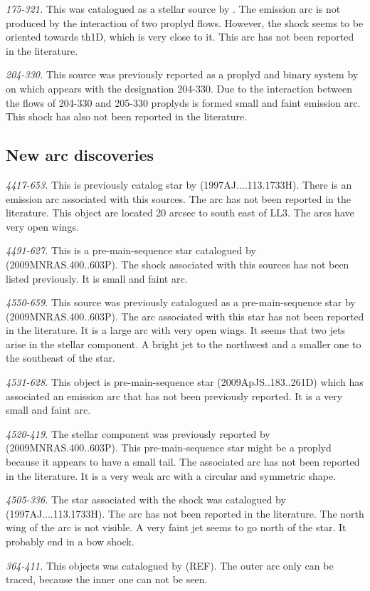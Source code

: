 \documentclass[iop, apj]{emulateapj}
\renewcommand\clearpage{}
\begin{document}
\textit{175-321.} This was catalogued as a stellar source by \citet{ODell:1996a}. The emission arc is not produced by the interaction of two proplyd flows. However, the shock seems to be oriented towards th1D, which is very close to it. This arc has not been reported in the literature.

\textit{204-330.} This source was previously reported as a proplyd and binary system by \citet{Ricci:2008a} on which appears with the designation 204-330.  Due to the interaction between the flows of 204-330 and 205-330 proplyds is formed small and faint emission arc. This shock has also not been reported in the literature.

\clearpage
\subsection{New arc discoveries}
\label{sec:new}

\textit{4417-653.} This is previously catalog star by (1997AJ....113.1733H). There is an emission arc associated with this sources. The arc has not been reported in the literature. This object are located 20 arcsec to south east of LL3. The arcs have very open wings.  

\textit{4491-627.} This is a pre-main-sequence star catalogued by (2009MNRAS.400..603P). The shock associated with this sources has not been listed previously. It is small and faint arc.

\textit{4550-659.} This source was previously catalogued as a pre-main-sequence star by (2009MNRAS.400..603P). The arc associated with this star has not been reported in the literature. It is a large arc with very open wings. It seems that two jets arise in the stellar component. A bright jet to the northwest and a smaller one to the southeast of the star.  

\textit{4531-628.} This object is pre-main-sequence star (2009ApJS..183..261D) which has associated an emission arc that has not been previously reported. It is a very small and faint arc.

\textit{4520-419.} The stellar component was previously reported by (2009MNRAS.400..603P). This pre-main-sequence star might be a proplyd because it appears to have a small tail. The associated arc has not been reported in the literature. It is a very weak arc with a circular and symmetric shape. 

\textit{4505-336.} The star associated with the shock was catalogued by (1997AJ....113.1733H). The arc has not been reported in the literature.  The north wing of the arc is not visible. A very faint jet seems to go north of the star. It probably end in a bow shock.    

\textit{364-411.} This objects was catalogued by (REF). The outer arc only can be traced, because the inner one can not be seen.  
\end{document}
